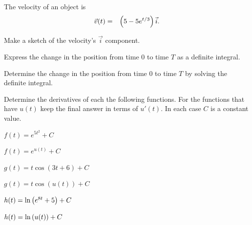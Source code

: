 \begin{problem}
\item The velocity of an object is
  \begin{eqnarray*}
    \vec{v}(t) & = & \left( 5 - 5 e^{t/3} \right) \vec{i}.
  \end{eqnarray*}
  \begin{subproblem}
  \item Make a sketch of the velocity's $\vec{i}$ component.
    \vfill
  \item Express the change in the position from time 0 to time $T$ as
    a definite integral.
    \vfill
  \item Determine the change in the position from time 0 to time $T$
    by solving the definite integral.
    \vfill
  \end{subproblem}
\end{problem}




\begin{problem}
\item Determine the derivatives of each the following functions. For
  the functions that have $u(t)$ keep the final answer in terms of
  $u'(t)$. In each case $C$ is a constant value.
  \begin{subproblem}
    \item $f(t) = e^{5t^2} + C$
      \vfill
    \item $f(t) = e^{u(t)} + C$
      \vfill
    \item $g(t) = t \cos(3t+6)  + C$
      \vfill
    \item $g(t) = t \cos(u(t))  + C$
      \vfill
    \item $h(t) = \ln\left( e^{8t} + 5 \right)  + C$
      \vfill
    \item $h(t) = \ln\left( u(t) \right)  + C$
      \vfill
  \end{subproblem}

\end{problem}


